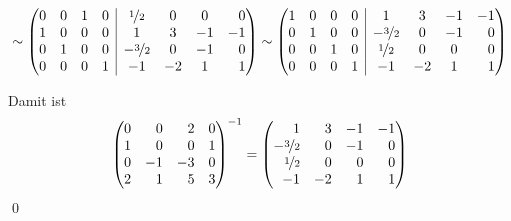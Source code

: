 \documentclass[answers]{exam}
\makeatletter
\newenvironment{sysmatrix}[1]
  {\left(\begin{array}{@{}#1@{}}}
  {\end{array}\right)}
\newcommand{\vektor}[1]{\begin{pmatrix*}[r] #1 \end{pmatrix*}}
\makeatother
\begin{document}
\begin{questions}
\begin{parts}
\begin{solution}
$$            $$
            $$
                \sim
                \begin{sysmatrix}{cccr|cccr}
                    0 & 0 & 1 & 0   & \nicefrac{1}{2} & 0 & 0 & 0 \\
                    1 & 0 & 0 & 0   & 1 & 3 & -1 & -1 \\
                    0 & 1 & 0 & 0 & -\nicefrac{3}{2} & 0 & -1 & 0 \\
                    0 & 0 & 0 & 1   & -1 & -2 & 1 & 1
                \end{sysmatrix}
                \sim
                \begin{sysmatrix}{cccr|cccr}
                    1 & 0 & 0 & 0   & 1 & 3 & -1 & -1 \\
                    0 & 1 & 0 & 0 & -\nicefrac{3}{2} & 0 & -1 & 0 \\
                    0 & 0 & 1 & 0   & \nicefrac{1}{2} & 0 & 0 & 0 \\
                    0 & 0 & 0 & 1   & -1 & -2 & 1 & 1
                \end{sysmatrix}
            $$

            Damit ist
            $$
                \vektor{0 & 0 & 2 & 0 \\ 1 & 0 & 0 & 1 \\ 0 & -1 & -3 & 0 \\ 2 & 1 & 5 & 3}^{-1} = \vektor{1 & 3 & -1 & -1 \\-\nicefrac{3}{2} & 0 & -1 & 0 \\ \nicefrac{1}{2} & 0 & 0 & 0 \\ -1 & -2 & 1 & 1}
            $$\qed
        \end{solution}

        \newpage

\end{parts}
\end{questions}
\end{document}
